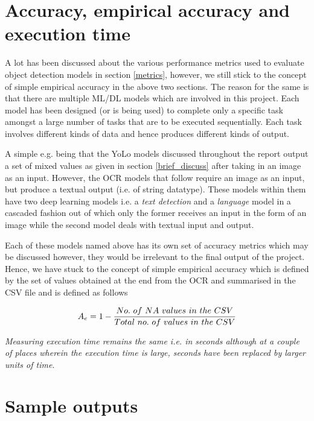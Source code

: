 \section{Accuracy, empirical accuracy and execution time}

A lot has been discussed about the various performance metrics used
to evaluate object detection models in section \ref{metrics},
however, we still stick to the concept of simple empirical accuracy
in the above two sections. The reason for the same is that there are
multiple ML/DL models which are involved in this project. Each model
has been designed (or is being used) to complete only a specific task
amongst a large number of tasks that are to be executed sequentially.
Each task involves different kinds of data and hence produces
different kinds of output. \par

A simple e.g. being that the YoLo models discussed throughout the
report output a set of mixed values as given in section
\ref{brief_discuss} after taking in an image as an input. However,
the OCR models that follow require an image as an input, but produce
a textual output (i.e. of string datatype). These models within them
have two deep learning models i.e. a \textit{text detection} and a
\textit{language} model in a cascaded fashion out of which only the
former receives an input in the form of an image while the second
model deals with textual input and output. \par

Each of these models named above has its own set of accuracy metrics
which may be discussed however, they would be irrelevant to the final
output of the project. Hence, we have stuck to the concept of simple
empirical accuracy which is defined by the set of values obtained at
the end from the OCR and summarised in the CSV file and is defined as follows

\begin{equation}
  \centering
  A_{e} = 1 - \frac{No. \ of  \ NA \ values \ in \ the \ CSV}{Total
  \ no. \ of \ values \ in \ the \ CSV }
\end{equation}

\textit{Measuring execution time remains the same i.e. in seconds
  although at a couple of places wherein the execution time is large,
seconds have been replaced by larger units of time}. \newpage

\section{Sample outputs}

